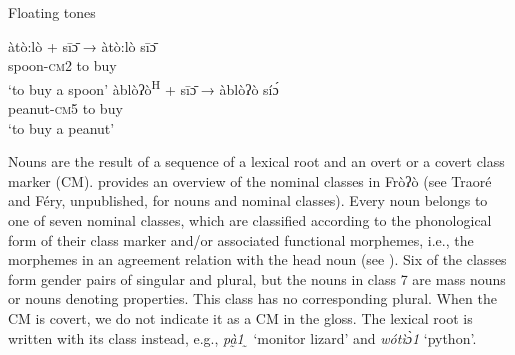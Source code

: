 \documentclass[output=paper]{langscibook}
\begin{document}
\begin{exe}
 \ex Floating tones \label{ex:traore:floating_tones:2}
\begin{xlist}
 \ex   \gll àtò:lò            +    sīɔ̄                  →          àtò:lò sīɔ̄  \label{ex:traore:floating_tones:2a}\\
          spoon-\textsc{cm}2    {}       {to buy}   {}            {}\\
        \trans `to buy a spoon’
 \ex  \gll àblòʔò\textsuperscript{H}      +    sīɔ̄                  →          àblòʔò síɔ́ \label{ex:traore:floating_tones:2b}\\
      peanut-\textsc{cm}5           {}    {to buy}          {}          {}\\
      \trans ‘to buy a peanut’
\end{xlist}
\end{exe}
 

 Nouns are the result of a sequence of a lexical root and an overt or a covert class marker (CM).  provides an overview of the nominal classes in Fròʔò (see Traoré and Féry, unpublished, for nouns and nominal classes). Every noun belongs to one of seven nominal classes, which are classified according to the phonological form of their class marker and/or associated functional morphemes, i.e., the morphemes in an agreement relation with the head noun (see \citealt{Corbett1991}). Six of the classes form gender pairs of singular and plural, but the nouns in class 7 are mass nouns or nouns denoting properties. This class has no corresponding plural. When the CM is covert, we do not indicate it as a CM in the gloss. The lexical root is written with its class instead, e.g., \textit{pà̰1 ̰} ‘monitor lizard’ and \textit{wótìɔ̀1} ‘python’.
\end{document}
